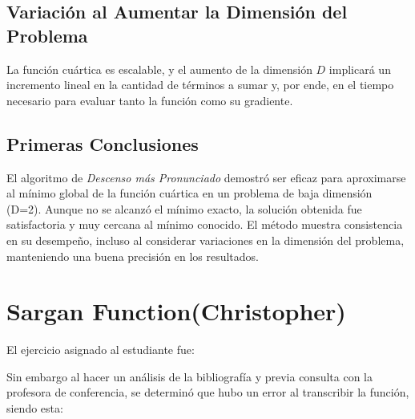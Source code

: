 \documentclass{article}
\begin{document}
	
	\subsection{Variación al Aumentar la Dimensión del Problema}
	
	La función cuártica es escalable, y el aumento de la dimensión \(D\) implicará un incremento lineal en la cantidad de términos a sumar y, por ende, en el tiempo necesario para evaluar tanto la función como su gradiente.
	
	\subsection{Primeras Conclusiones}
	
	El algoritmo de \textit{Descenso más Pronunciado} demostró ser eficaz para aproximarse al mínimo global de la función cuártica en un problema de baja dimensión (D=2). Aunque no se alcanzó el mínimo exacto, la solución obtenida fue satisfactoria y muy cercana al mínimo conocido. El método muestra consistencia en su desempeño, incluso al considerar variaciones en la dimensión del problema, manteniendo una buena precisión en los resultados.

		
	
	\section{Sargan Function(Christopher)}
	
	El ejercicio asignado al estudiante fue:
	
	\vspace*{1cm}
	
	
	\vspace*{1cm}
	
	Sin embargo al hacer un análisis de la bibliografía \cite{reference29} y previa consulta con la profesora de conferencia, se determinó que hubo un error al transcribir la función, siendo esta:
	
\end{document}
